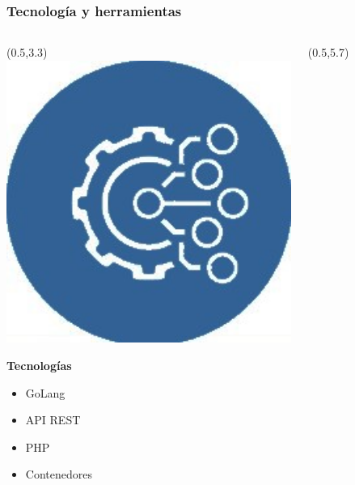 \documentclass[10pt]{beamer}
\begin{document}
\begin{frame}
\frametitle{Tecnología y herramientas}
\vspace{-1.5cm}
\begin{columns}[T]
\begin{column}{0.33\textwidth}
   \begin{textblock}{1.75}(0.5,3.3)
		\includegraphics[width =1\textwidth]{Figuras/technology.jpg}
	\end{textblock}
   \textbf{\textcolor{burgundy}{Tecnologías}}
   \begin{itemize}
   		\item GoLang
   		\item API REST
   		\item PHP
   		\item Contenedores
   \end{itemize} \pause
\end{column}
\hspace{-0.8cm}
\begin{column}{0.33\textwidth}
	\begin{textblock}{2}(0.5,5.7)

\end{textblock}
\end{column}
\end{columns}
\end{frame}
\end{document}
